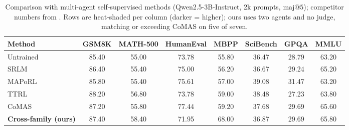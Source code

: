 \begin{table}[t]\centering\small
\setlength{\tabcolsep}{5pt}\renewcommand{\arraystretch}{1.12}
\begin{tabular}{l ccccccc}
\toprule
Method & GSM8K & MATH-500 & HumanEval & MBPP & SciBench & GPQA & MMLU \\
\midrule
Untrained & 85.40 & 55.00 & 73.78 & 55.80 & 36.47 & 28.79 & 63.20 \\
SRLM & \cellcolor{heat!19}86.40 & \cellcolor{heat!6}55.40 & \cellcolor{heat!35}75.00 & \cellcolor{heat!6}56.20 & \cellcolor{heat!6}36.67 & \cellcolor{heat!31}29.24 & \cellcolor{heat!46}65.20 \\
MAPoRL & \cellcolor{heat!6}85.80 & \cellcolor{heat!6}55.40 & \cellcolor{heat!41}75.61 & \cellcolor{heat!10}57.00 & \cellcolor{heat!58}39.08 & \cellcolor{heat!58}31.47 & \cellcolor{heat!6}63.20 \\
TTRL & \cellcolor{heat!58}88.20 & \cellcolor{heat!30}56.80 & \cellcolor{heat!23}73.78 & \cellcolor{heat!18}59.00 & \cellcolor{heat!45}38.48 & \cellcolor{heat!6}27.23 & \cellcolor{heat!18}63.80 \\
CoMAS & \cellcolor{heat!36}87.20 & \cellcolor{heat!13}55.80 & \cellcolor{heat!58}77.44 & \cellcolor{heat!19}59.20 & \cellcolor{heat!28}37.68 & \cellcolor{heat!36}29.69 & \cellcolor{heat!54}65.60 \\
\textbf{Cross-family (ours)} & \cellcolor{heat!41}87.40 & \cellcolor{heat!58}58.40 & \cellcolor{heat!6}71.95 & \cellcolor{heat!58}68.00 & \cellcolor{heat!10}36.87 & \cellcolor{heat!36}29.69 & \cellcolor{heat!58}65.80 \\
\bottomrule
\end{tabular}
\caption{Comparison with multi-agent self-supervised methods (Qwen2.5-3B-Instruct, 2k prompts, $\mathrm{maj}@5$); competitor numbers from \citet{comas2025}. Rows are heat-shaded per column (darker = higher); ours uses two agents and no judge, matching or exceeding CoMAS on five of seven.}
\label{tab:comas}
\end{table}